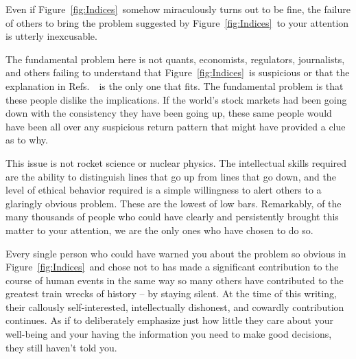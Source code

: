 \documentclass[twocolumn,twoside,prd,floatfix,letterpaper]{revtex4}
\def \FigMain {Figure~\ref{fig:Indices}}
\def \theExplanation {\cite{knuteson2016,knuteson2018,knuteson2019}}
\def \RefsTheExplanation {Refs.~\theExplanation}
\begin{document}
Even if \FigMain\ somehow miraculously turns out to be fine, the failure of others to bring the problem suggested by \FigMain\ to your attention is utterly inexcusable.

The fundamental problem here is not quants, economists, regulators, journalists, and others failing to understand that \FigMain\ is suspicious or that the explanation in \RefsTheExplanation\ is the only one that fits.  The fundamental problem is that these people dislike the implications.  If the world's stock markets had been going down with the consistency they have been going up, these same people would have been all over any suspicious return pattern that might have provided a clue as to why.  

This issue is not rocket science or nuclear physics.  The intellectual skills required are the ability to distinguish lines that go up from lines that go down, and the level of ethical behavior required is a simple willingness to alert others to a glaringly obvious problem.  These are the lowest of low bars.  Remarkably, of the many thousands of people who could have clearly and persistently brought this matter to your attention, we are the only ones who have chosen to do so.  

Every single person who could have warned you about the problem so obvious in \FigMain\ and chose not to has made a significant contribution to the course of human events in the same way so many others have contributed to the greatest train wrecks of history -- by staying silent.  At the time of this writing, their callously self-interested, intellectually dishonest, and cowardly contribution continues.  As if to deliberately emphasize just how little they care about your well-being and your having the information you need to make good decisions, they still haven't told you.


\end{document}
